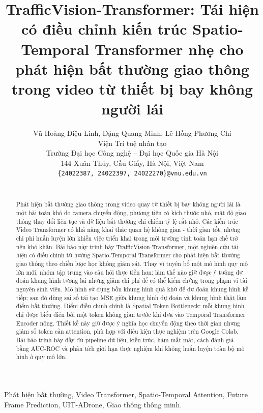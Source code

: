 \documentclass[a4paper, 10pt, conference]{ieeeconf}
\title{\LARGE \bf
TrafficVision-Transformer: Tái hiện có điều chỉnh kiến trúc Spatio-Temporal Transformer nhẹ cho phát hiện bất thường giao thông trong video từ thiết bị bay không người lái
}
\author{Vũ Hoàng Diệu Linh, Đặng Quang Minh, Lê Hồng Phương Chi%
\\ Viện Trí tuệ nhân tạo \\
Trường Đại học Công nghệ -- Đại học Quốc gia Hà Nội \\
144 Xuân Thủy, Cầu Giấy, Hà Nội, Việt Nam \\
{\tt\small\{24022387, 24022397, 24022270\}@vnu.edu.vn} \\ \\
}
\begin{document}
\maketitle
\thispagestyle{plain}
\pagestyle{plain}

\begin{abstract}
Phát hiện bất thường giao thông trong video quay từ thiết bị bay không người lái là một bài toán khó do camera chuyển động, phương tiện có kích thước nhỏ, mật độ giao thông thay đổi liên tục và dữ liệu bất thường chỉ chiếm tỷ lệ rất nhỏ. Các kiến trúc Video Transformer có khả năng khai thác quan hệ không gian - thời gian tốt, nhưng chi phí huấn luyện lớn khiến việc triển khai trong môi trường tính toán hạn chế trở nên khó khăn. Bài báo này trình bày TrafficVision-Transformer, một nghiên cứu tái hiện có điều chỉnh từ hướng Spatio-Temporal Transformer cho phát hiện bất thường giao thông theo chiến lược học không giám sát. Thay vì tuyên bố một mô hình quy mô lớn mới, nhóm tập trung vào câu hỏi thực tiễn hơn: làm thế nào giữ được ý tưởng dự đoán khung hình tương lai nhưng giảm chi phí để có thể kiểm chứng trong phạm vi tài nguyên sinh viên. Mô hình sử dụng bốn khung hình quá khứ để dự đoán khung hình kế tiếp; sau đó dùng sai số tái tạo MSE giữa khung hình dự đoán và khung hình thật làm điểm bất thường. Điểm điều chỉnh chính là Spatial Token Bottleneck: mỗi khung hình chỉ được biểu diễn bởi một token không gian trước khi đưa vào Temporal Transformer Encoder nông. Thiết kế này giữ được ý nghĩa học chuyển động theo thời gian nhưng giảm số token cần attention, phù hợp với điều kiện thực nghiệm trên Google Colab. Bài báo trình bày đầy đủ pipeline dữ liệu, kiến trúc, hàm mất mát, cách đánh giá bằng AUC-ROC và phân tích giới hạn thực nghiệm khi không huấn luyện toàn bộ mô hình ở quy mô lớn.
\end{abstract}

\begin{keywords}
Phát hiện bất thường, Video Transformer, Spatio-Temporal Attention, Future Frame Prediction, UIT-ADrone, Giao thông thông minh.
\end{keywords}








\newpage
\onecolumn

\end{document}
